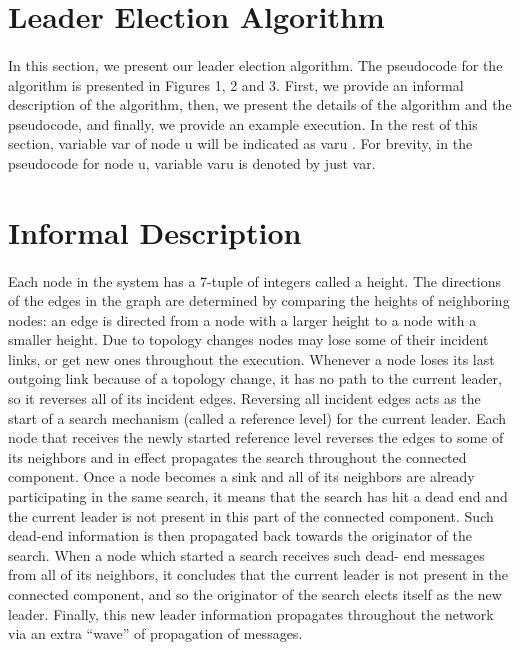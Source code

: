 \section{Leader Election Algorithm}
\paragraph{}In this section, we present our leader election algorithm. The pseudocode for the algorithm is presented in Figures 1, 2 and 3. First, we provide an informal description of the algorithm, then, we present the details of the algorithm and the pseudocode, and finally, we provide an example execution. In the rest of this section, variable var of node u will be indicated as varu . For brevity, in the pseudocode for node u, variable varu is denoted by just var.
\section{Informal Description}
\paragraph{}Each node in the system has a 7-tuple of integers called a height. The directions of the edges in the graph are determined by comparing the heights of neighboring nodes: an edge is directed from a node with a larger height to a node with a smaller height. Due to topology changes nodes may lose some of their incident links, or get new ones throughout the execution. Whenever a node loses its last outgoing link because of a topology change, it has no path to the current leader, so it reverses all of its incident edges. Reversing all incident edges acts as the start of a search mechanism (called a reference level) for the current leader. Each node that receives the newly started reference level reverses the edges to some of its neighbors and in effect propagates the search throughout the connected component. Once a node becomes a sink and all of its neighbors are already participating in the same search, it means that the search has hit a dead end and the current leader is not present in this part of the connected component. Such dead-end information is then propagated back towards the originator of the search. When a node which started a search receives such dead- end messages from all of its neighbors, it concludes that the current leader is not present in the connected component, and so the originator of the search elects itself as the new leader. Finally, this new leader information propagates throughout the network via an extra “wave” of propagation of messages.
